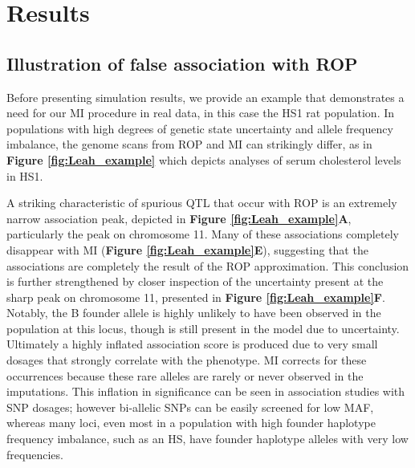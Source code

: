 \section{Results}

\subsection{Illustration of false association with ROP}

Before presenting simulation results, we provide an example that demonstrates a need for our MI procedure in real data, in this case the HS1 rat population. In populations with high degrees of genetic state uncertainty and allele frequency imbalance, the genome scans from ROP and MI can strikingly differ, as in \textbf{Figure \ref{fig:Leah_example}} which depicts analyses of serum cholesterol levels in HS1.

A striking characteristic of spurious QTL that occur with ROP is an extremely narrow association peak, depicted in \textbf{Figure \ref{fig:Leah_example}A}, particularly the peak on chromosome 11. Many of these associations completely disappear with MI (\textbf{Figure \ref{fig:Leah_example}E}), suggesting that the associations are completely the result of the ROP approximation. This conclusion is further strengthened by closer inspection of the uncertainty present at the sharp peak on chromosome 11, presented in \textbf{Figure \ref{fig:Leah_example}F}. Notably, the B founder allele is highly unlikely to have been observed in the population at this locus, though is still present in the model due to uncertainty. Ultimately a highly inflated association score is produced due to very small dosages that strongly correlate with the phenotype. MI corrects for these occurrences because these rare alleles are rarely or never observed in the imputations. This inflation in significance can be seen in association studies with SNP dosages; however bi-allelic SNPs can be easily screened for low MAF, whereas many loci, even most in a population with high founder haplotype frequency imbalance, such as an HS, have founder haplotype alleles with very low frequencies.

